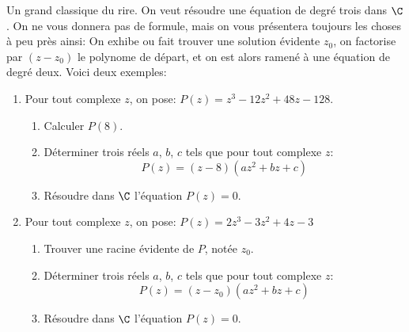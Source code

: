 \begin{exercice}
Un grand classique du rire. On veut r\'esoudre une \'equation
  de degr\'e trois dans $\C$. On ne vous donnera pas de formule, mais
  on vous pr\'esentera toujours les choses \`a peu pr\`es ainsi: On exhibe
  ou fait trouver une \og solution \'evidente\fg{} $z_0$, on factorise
  par $(z-z_0)$ le polynome de d\'epart, et on est alors ramen\'e \`a
  une \'equation de degr\'e deux. Voici deux exemples:
  \begin{enumerate}
  \item Pour tout complexe $z$, on pose: $P(z)=z^3-12z^2+48z-128$.
    \begin{enumerate}
    \item Calculer $P(8)$.
    \item  D\'eterminer trois
    r\'eels $a$, $b$, $c$ tels que pour tout complexe $z$:
\[ P(z)=(z-8)(az^2+bz+c)\]

\item R\'esoudre dans $\C$ l'\'equation $P(z)=0$.
    \end{enumerate} 


  \item Pour tout complexe $z$, on pose: $P(z)=2z^3-3z^2+4z-3$
\begin{enumerate}
    \item Trouver une racine \'evidente de $P$, not\'ee $z_0$.
    \item  D\'eterminer trois
    r\'eels $a$, $b$, $c$ tels que pour tout complexe $z$:
\[ P(z)=(z-z_0)(az^2+bz+c)\]

\item R\'esoudre dans $\C$ l'\'equation $P(z)=0$.
    \end{enumerate} 

  \end{enumerate}
  
\end{exercice}
